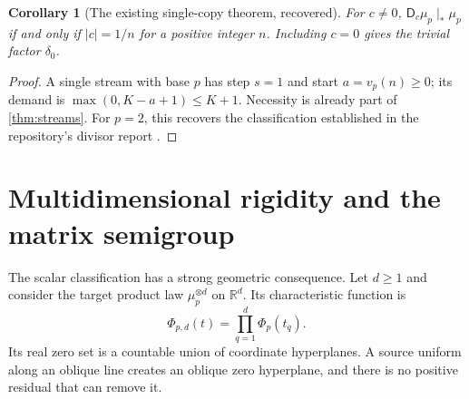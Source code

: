 \documentclass[11pt,a4paper]{article}
\newtheorem{corollary}[theorem]{Corollary}
\theoremstyle{remark}
\newcommand{\R}{\mathbb R}
\newcommand{\dil}[1]{\mathsf D_{#1}}
\begin{document}
\begin{corollary}[The existing single-copy theorem, recovered]
\label{cor:single}
For $c\ne0$, $\dil c\mu_p\mid_*\mu_p$ if and only if $|c|=1/n$ for a positive
integer $n$. Including $c=0$ gives the trivial factor $\delta_0$.
\end{corollary}
\begin{proof}
A single stream with base $p$ has step $s=1$ and start $a=v_p(n)\ge0$;
its demand is $\max(0,K-a+1)\le K+1$. Necessity is already part of
\cref{thm:streams}. For $p=2$, this recovers the classification established
in the repository's divisor report \cite{RepoDivisors}.
\end{proof}

\section{Multidimensional rigidity and the matrix semigroup}
\label{sec:multi}

The scalar classification has a strong geometric consequence. Let $d\ge1$ and
consider the target product law $\mu_p^{\otimes d}$ on $\R^d$. Its characteristic
function is
\[
 \Phi_{p,d}(t)=\prod_{q=1}^{d}\Phi_p(t_q).
\]
Its real zero set is a countable union of coordinate hyperplanes. A source
uniform along an oblique line creates an oblique zero hyperplane, and there is
no positive residual that can remove it.
\end{document}
